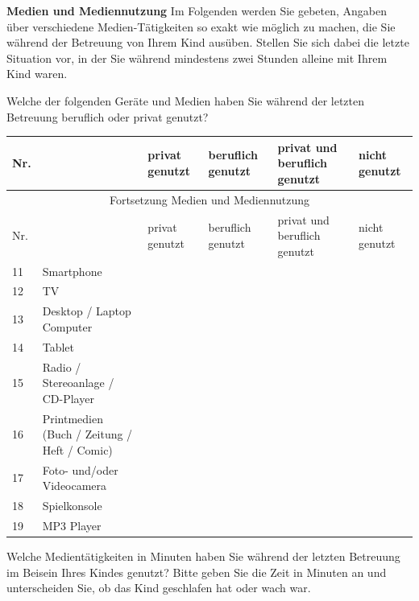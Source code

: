 \begin{flushleft}
\begin{longtable}[c]{ |p{1em}|p{16em}|p{16em}| }
\end{longtable}

\bigskip
\textbf{Medien und Mediennutzung}\label{sec:app_mediennutzung}
Im Folgenden werden Sie gebeten, Angaben über verschiedene Medien-Tätigkeiten so exakt wie möglich zu machen, die Sie während der Betreuung von Ihrem Kind ausüben. Stellen Sie sich dabei die letzte Situation vor, in der Sie während mindestens zwei Stunden alleine mit Ihrem Kind waren.

\vspace{2mm}
Welche der folgenden Geräte und Medien haben Sie während der letzten Betreuung beruflich oder privat genutzt?

\begin{longtable}[c]{ |p{1em}|p{12em}|p{4em}|p{4em}|p{4em}|p{4em}|}
 
  \hline
  Nr. &  & privat genutzt & beruflich genutzt & privat und beruflich genutzt & nicht genutzt \\
  \hline
  \endfirsthead
 
  \hline
  \multicolumn{6}{|c|}{ Fortsetzung Medien und Mediennutzung}\\
  \hline
  Nr. &  & privat genutzt & beruflich genutzt & privat und beruflich genutzt & nicht genutzt \\
  \hline
  \endhead
 
  \hline
  \endfoot
 
  \hline\hline
  \endlastfoot
  
  
  11 & Smartphone &  &  &  &  \\
  12 & TV &  &  &  &  \\
  13 & Desktop / Laptop Computer &  &  &  &  \\
  14 & Tablet &  &  &  &  \\
  15 & Radio / Stereoanlage / CD-Player &  &  &  &  \\
  16 & Printmedien (Buch / Zeitung / Heft / Comic) &  &  &  &  \\
  17 & Foto- und/oder Videocamera &  &  &  &  \\
  18 & Spielkonsole &  &  &  &  \\
  19 & MP3 Player &  &  &  &  \\
  
\end{longtable}

Welche Medientätigkeiten in Minuten haben Sie während der letzten Betreuung im Beisein Ihres Kindes genutzt? Bitte geben Sie die Zeit in Minuten an und unterscheiden Sie, ob das Kind geschlafen hat oder wach war.

\end{flushleft}